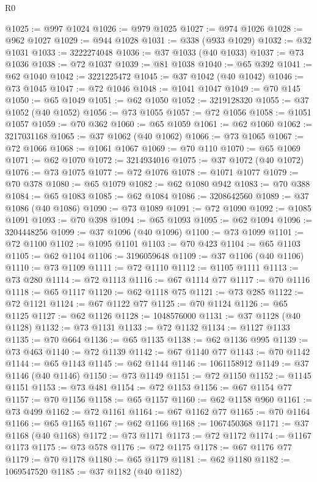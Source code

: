 \begin{lexlean}{R0}
\begin{coremodule}
@1025 := @997 @1024
@1026 := @979 @1025
@1027 := @974 @1026
@1028 := @962 @1027
@1029 := @944 @1028
@1031 := @338 (@933 @1029)
@1032 := @32 @1031
@1033 := 3222274048
@1036 := @37 @1033 (@40 @1033)
@1037 := @73 @1036
@1038 := @72 @1037
@1039 := @81 @1038
@1040 := @65 @392
@1041 := @62 @1040
@1042 := 3221225472
@1045 := @37 @1042 (@40 @1042)
@1046 := @73 @1045
@1047 := @72 @1046
@1048 := @1041 @1047
@1049 := @70 @145
@1050 := @65 @1049
@1051 := @62 @1050
@1052 := 3219128320
@1055 := @37 @1052 (@40 @1052)
@1056 := @73 @1055
@1057 := @72 @1056
@1058 := @1051 @1057
@1059 := @70 @362
@1060 := @65 @1059
@1061 := @62 @1060
@1062 := 3217031168
@1065 := @37 @1062 (@40 @1062)
@1066 := @73 @1065
@1067 := @72 @1066
@1068 := @1061 @1067
@1069 := @70 @110
@1070 := @65 @1069
@1071 := @62 @1070
@1072 := 3214934016
@1075 := @37 @1072 (@40 @1072)
@1076 := @73 @1075
@1077 := @72 @1076
@1078 := @1071 @1077
@1079 := @70 @378
@1080 := @65 @1079
@1082 := @62 @1080 @942
@1083 := @70 @388
@1084 := @65 @1083
@1085 := @62 @1084
@1086 := 3208642560
@1089 := @37 @1086 (@40 @1086)
@1090 := @73 @1089
@1091 := @72 @1090
@1092 := @1085 @1091
@1093 := @70 @398
@1094 := @65 @1093
@1095 := @62 @1094
@1096 := 3204448256
@1099 := @37 @1096 (@40 @1096)
@1100 := @73 @1099
@1101 := @72 @1100
@1102 := @1095 @1101
@1103 := @70 @423
@1104 := @65 @1103
@1105 := @62 @1104
@1106 := 3196059648
@1109 := @37 @1106 (@40 @1106)
@1110 := @73 @1109
@1111 := @72 @1110
@1112 := @1105 @1111
@1113 := @73 @280
@1114 := @72 @1113
@1116 := @67 @1114 @77
@1117 := @70 @1116
@1118 := @65 @1117
@1120 := @62 @1118 @75
@1121 := @73 @285
@1122 := @72 @1121
@1124 := @67 @1122 @77
@1125 := @70 @1124
@1126 := @65 @1125
@1127 := @62 @1126
@1128 := 1048576000
@1131 := @37 @1128 (@40 @1128)
@1132 := @73 @1131
@1133 := @72 @1132
@1134 := @1127 @1133
@1135 := @70 @664
@1136 := @65 @1135
@1138 := @62 @1136 @995
@1139 := @73 @463
@1140 := @72 @1139
@1142 := @67 @1140 @77
@1143 := @70 @1142
@1144 := @65 @1143
@1145 := @62 @1144
@1146 := 1061158912
@1149 := @37 @1146 (@40 @1146)
@1150 := @73 @1149
@1151 := @72 @1150
@1152 := @1145 @1151
@1153 := @73 @481
@1154 := @72 @1153
@1156 := @67 @1154 @77
@1157 := @70 @1156
@1158 := @65 @1157
@1160 := @62 @1158 @960
@1161 := @73 @499
@1162 := @72 @1161
@1164 := @67 @1162 @77
@1165 := @70 @1164
@1166 := @65 @1165
@1167 := @62 @1166
@1168 := 1067450368
@1171 := @37 @1168 (@40 @1168)
@1172 := @73 @1171
@1173 := @72 @1172
@1174 := @1167 @1173
@1175 := @73 @578
@1176 := @72 @1175
@1178 := @67 @1176 @77
@1179 := @70 @1178
@1180 := @65 @1179
@1181 := @62 @1180
@1182 := 1069547520
@1185 := @37 @1182 (@40 @1182)

\end{coremodule}
\end{lexlean}
